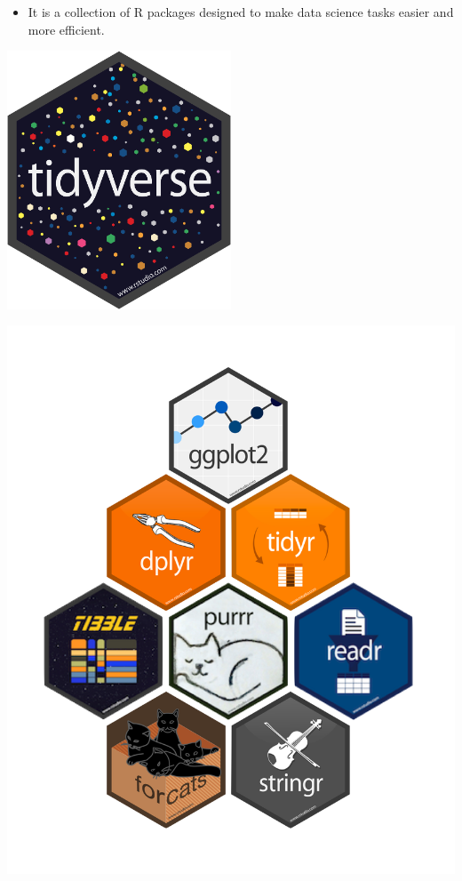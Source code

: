 \documentclass[
  letterpaper,
  DIV=11,
  numbers=noendperiod,
  oneside]{scrartcl}
\providecommand{\tightlist}{%
  \setlength{\itemsep}{0pt}\setlength{\parskip}{0pt}}\usepackage{longtable,booktabs,array}
\begin{document}
\begin{itemize}
\tightlist
\item
  It is a collection of R packages designed to make data science tasks
  easier and more efficient.
\end{itemize}

\begin{center}
\includegraphics[width=0.5\textwidth,height=\textheight]{Intro_R_files/mediabag/tidyverse.png}
\end{center}

\includegraphics[width=1\textwidth,height=\textheight]{Intro_R_files/mediabag/tidyverse-packages.png}
\end{document}
